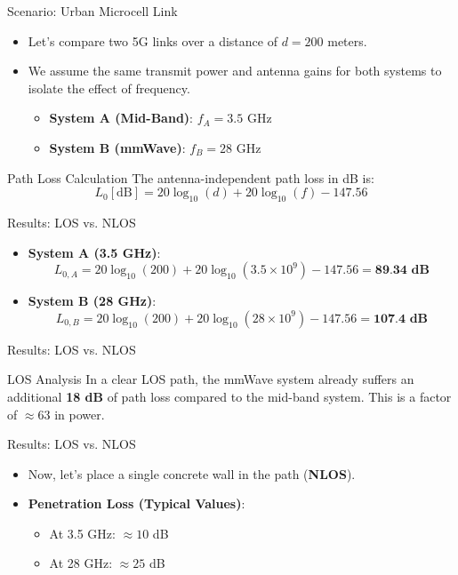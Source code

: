 \documentclass{beamer}
\begin{document}
	\begin{frame}{Scenario: Urban Microcell Link}
		\begin{itemize}
			\item Let's compare two 5G links over a distance of $d = 200$ meters.
			\item We assume the same transmit power and antenna gains for both systems to isolate the effect of frequency.
			\begin{itemize}
				\item \textbf{System A (Mid-Band)}: $f_A = 3.5$ GHz
				\item \textbf{System B (mmWave)}: $f_B = 28$ GHz
			\end{itemize}
		\end{itemize}
		\begin{block}{Path Loss Calculation}
			The antenna-independent path loss in dB is:
			\[ L_0[\text{dB}] = 20\log_{10}(d) + 20\log_{10}(f) - 147.56 \]
		\end{block}
	\end{frame}
	
	\begin{frame}{Results: LOS vs. NLOS}
		\begin{itemize}
			\item \textbf{System A (3.5 GHz)}:
			\[ L_{0,A} = 20\log_{10}(200) + 20\log_{10}(3.5 \times 10^9) - 147.56 = \textbf{89.34 dB} \]
			\item \textbf{System B (28 GHz)}:
			\[ L_{0,B} = 20\log_{10}(200) + 20\log_{10}(28 \times 10^9) - 147.56  = \textbf{107.4 dB} \]
		\end{itemize}
	\end{frame}
	
	\begin{frame}{Results: LOS vs. NLOS}
		\begin{alertblock}{LOS Analysis}
			In a clear LOS path, the mmWave system already suffers an additional \textbf{18 dB} of path loss compared to the mid-band system. This is a factor of $\approx 63$ in power.
		\end{alertblock}
	\end{frame}
	
	\begin{frame}{Results: LOS vs. NLOS}
		\begin{itemize}
			\item Now, let's place a single concrete wall in the path (\textbf{NLOS}).
			\item \textbf{Penetration Loss (Typical Values)}:
			\begin{itemize}
				\item At 3.5 GHz: $\approx 10$ dB
				\item At 28 GHz: $\approx 25$ dB
			\end{itemize}
		\end{itemize}
	\end{frame}
	
\end{document}
